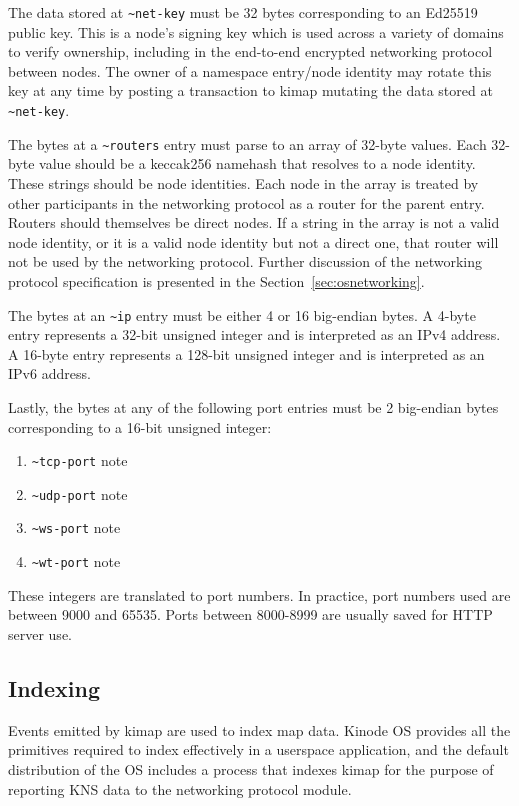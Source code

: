 \documentclass[runningheads]{llncs}
\begin{document}
The data stored at \verb|~net-key| must be 32 bytes corresponding to an Ed25519 public key.
This is a node's signing key which is used across a variety of domains to verify ownership, including in the end-to-end encrypted networking protocol between nodes.
The owner of a namespace entry/node identity may rotate this key at any time by posting a transaction to kimap mutating the data stored at \verb|~net-key|.

The bytes at a \verb|~routers| entry must parse to an array of 32-byte values.
Each 32-byte value should be a keccak256 namehash that resolves to a node identity.
These strings should be node identities.
Each node in the array is treated by other participants in the networking protocol as a router for the parent entry.
Routers should themselves be direct nodes.
If a string in the array is not a valid node identity, or it is a valid node identity but not a direct one, that router will not be used by the networking protocol.
Further discussion of the networking protocol specification is presented in the Section~\ref{sec:osnetworking}.

The bytes at an \verb|~ip| entry must be either 4 or 16 big-endian bytes.
A 4-byte entry represents a 32-bit unsigned integer and is interpreted as an IPv4 address.
A 16-byte entry represents a 128-bit unsigned integer and is interpreted as an IPv6 address.

Lastly, the bytes at any of the following port entries must be 2 big-endian bytes corresponding to a 16-bit unsigned integer:

\begin{enumerate}
	\item \verb|~tcp-port| note
	\item \verb|~udp-port| note
	\item \verb|~ws-port| note
	\item \verb|~wt-port| note
\end{enumerate}

These integers are translated to port numbers.
In practice, port numbers used are between 9000 and 65535.
Ports between 8000-8999 are usually saved for HTTP server use.

\subsection{Indexing}
\label{sec:knsindexing}

Events emitted by kimap are used to index map data.
Kinode OS provides all the primitives required to index effectively in a userspace application, and the default distribution of the OS includes a process that indexes kimap for the purpose of reporting KNS data to the networking protocol module.
\end{document}
